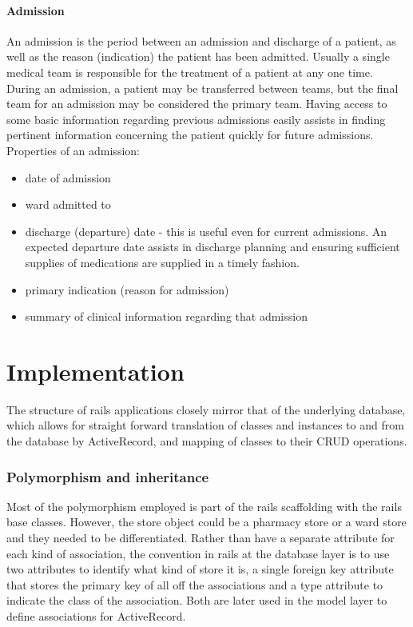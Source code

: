 \documentclass[letterpaper]{amsart}
\begin{document}
\subsection{Admission} An admission is the period between an admission and discharge of a patient, as well as the reason (indication) the patient has been admitted.  Usually a single medical team is responsible for the treatment of a patient at any one time.  During an admission, a patient may be transferred between teams, but the final team for an admission may be considered the primary team.  Having access to some basic information regarding previous admissions easily assists in finding pertinent information concerning the patient quickly for future admissions.   
Properties of an admission:\\
\begin{itemize}
    \item date of admission 
    \item ward admitted to 
    \item discharge (departure) date - this is useful even for current admissions.  An expected departure date assists in discharge planning and ensuring sufficient supplies of medications are supplied in a timely fashion. 
    \item primary indication (reason for admission) 
    \item summary of clinical information regarding that admission 
\end{itemize}

\part{Implementation}
The structure of rails applications closely mirror that of the underlying database, which allows for straight forward translation of classes and instances to and from the database by ActiveRecord, and mapping of classes to their CRUD operations.

\section{Polymorphism and inheritance}
Most of the polymorphism employed is part of the rails scaffolding with the rails base classes.  However, the store object could be a pharmacy store or a ward store and they needed to be differentiated.  Rather than have a separate attribute for each kind of association, the convention in rails at the database layer is to use two attributes to identify what kind of store it is, a single foreign key attribute that stores the primary key of all off the associations and a type attribute to indicate the class of the association.  Both are later used in the model layer to define associations for ActiveRecord.
\end{document}
